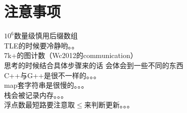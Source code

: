 \section{注意事项}
    $10^{6}$数量级慎用后缀数组\\
    TLE的时候要冷静哟。。\\
    7k+的图计数（Wc2012的communication）\\
    思考的时候结合具体步骤来的话 会体会到一些不同的东西\\
    C++与G++是很不一样的。。。\\
    map套字符串是很慢的。。。\\ 
    栈会被记录内存。。。\\
    浮点数最短路要注意取$\leq$来判断更新。。。\\